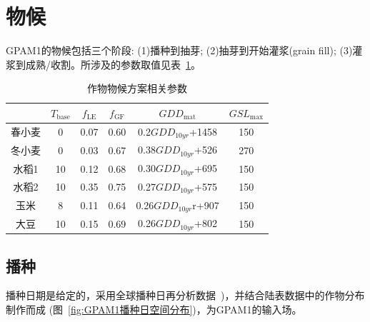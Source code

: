 \section{物候}
GPAM1的物候包括三个阶段: (1)播种到抽芽; (2)抽芽到开始灌浆(grain fill); (3)灌浆到成熟/收割。所涉及的参数取值见表~\ref{tab:作物物候方案相关参数}。

\begin{table}[htbp]
  \centering
  \caption{作物物候方案相关参数}
  \label{tab:作物物候方案相关参数}
  \begin{tabular}{@{}cccccc@{}}
    \toprule
           & $T_{\mathrm{base}}$ & $f_{\mathrm{LE}}$ & $f_{\mathrm{GF}}$ & $GDD_{\mathrm{mat}}$  & $GSL_{\mathrm{max}}$ \\ \midrule
    春小麦 & 0                   & 0.07              & 0.60              & 0.2$GDD_{10yr}$+1458  & 150                  \\
    冬小麦 & 0                   & 0.03              & 0.67              & 0.38$GDD_{10yr}$+526  & 270                  \\
    水稻1  & 10                  & 0.12              & 0.68              & 0.30$GDD_{10yr}$+695  & 150                  \\
    水稻2  & 10                  & 0.35              & 0.75              & 0.27$GDD_{10yr}$+575  & 150                  \\
    玉米   & 8                   & 0.11              & 0.64              & 0.26$GDD_{10yr}$r+907 & 150                  \\
    大豆   & 10                  & 0.15              & 0.69              & 0.26$GDD_{10yr}$+802  & 150                  \\ \bottomrule
  \end{tabular}
\end{table}

\subsection{播种}\label{sec:播种}
  播种日期是给定的，采用全球播种日再分析数据~\citep{jagermeyr2021climate})，并结合陆表数据中的作物分布制作而成 (图~\ref{fig:GPAM1播种日空间分布})，为GPAM1的输入场。


